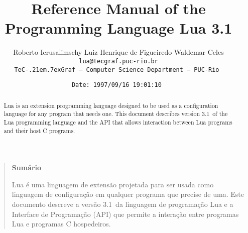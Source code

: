 

\newcommand{\See}[1]{Section~\ref{#1}}
\newcommand{\see}[1]{(see \See{#1})}
\newcommand{\M}[1]{\emph{#1}}
\newcommand{\T}[1]{{\tt #1}}
\newcommand{\Math}[1]{$#1$}
\newcommand{\nil}{{\bf nil}}
\newcommand{\Line}{\rule{\linewidth}{.5mm}}
\def\tecgraf{{\sf TeC\kern-.21em\lower.7ex\hbox{Graf}}}

\newcommand{\Index}[1]{#1\index{#1}}
\newcommand{\IndexVerb}[1]{\T{#1}\index{#1}}
\newcommand{\Def}[1]{\emph{#1}\index{#1}}
\newcommand{\Deffunc}[1]{\index{#1}}

\newcommand{\ff}{$\bullet$\ }

\newcommand{\Version}{3.1}

\makeindex



\title{Reference Manual of the Programming Language Lua \Version}

\author{%
Roberto Ierusalimschy\quad
Luiz Henrique de Figueiredo\quad
Waldemar Celes
\vspace{1.0ex}\\
\smallskip
\small\tt lua@tecgraf.puc-rio.br
\vspace{2.0ex}\\
\tecgraf\ --- Computer Science Department --- PUC-Rio
}

\date{\small \verb$Date: 1997/09/16 19:01:10 $}

\maketitle

\thispagestyle{empty}
\pagestyle{empty}

\begin{abstract}
\noindent
Lua is an extension programming language designed to be used
as a configuration language for any program that needs one.
This document describes version \Version\ of the Lua programming language and
the API that allows interaction between Lua programs and their host C programs.
\end{abstract}

\vspace{4ex}
\begin{quotation}
\small
\begin{center}{\bf Sum\'ario}\end{center}
\vspace{1ex}
\noindent
Lua \'e uma linguagem de extens\~ao projetada para ser usada como
linguagem de configura\c{c}\~ao em qualquer programa que precise de
uma.
Este documento descreve a vers\~ao \Version\ da linguagem de
programa\c{c}\~ao Lua e a Interface de Programa\c{c}\~ao (API) que permite
a intera\c{c}\~ao entre programas Lua e programas C hospedeiros.
\end{quotation}


